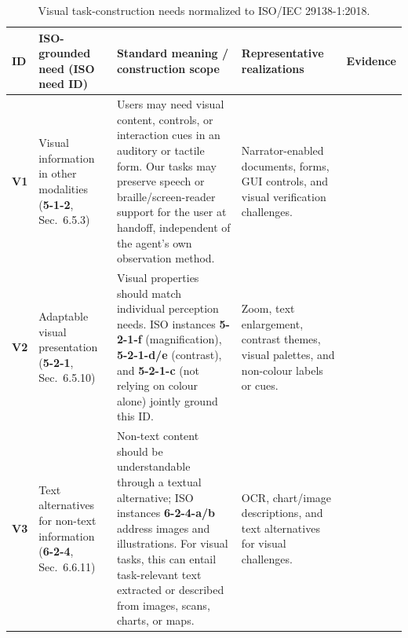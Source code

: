 \documentclass[11pt]{article}
\begin{document}
\begin{table}[t]
\centering
\scriptsize
\begin{tabularx}{\textwidth}{>{\bfseries}p{} p{} p{} X p{}}
\toprule
ID & ISO-grounded need (ISO need ID) & Standard meaning / construction scope & Representative realizations & Evidence \tabularnewline
\midrule
V1 & Visual information in other modalities (\textbf{5-1-2}, Sec.~6.5.3) & Users may need visual content, controls, or interaction cues in an auditory or tactile form. Our tasks may preserve speech or braille/screen-reader support for the user at handoff, independent of the agent's own observation method. & Narrator-enabled documents, forms, GUI controls, and visual verification challenges. & \citep{iso29138,webaimsr,w3cvisual,w3cstories} \tabularnewline
V2 & Adaptable visual presentation (\textbf{5-2-1}, Sec.~6.5.10) & Visual properties should match individual perception needs. ISO instances \textbf{5-2-1-f} (magnification), \textbf{5-2-1-d/e} (contrast), and \textbf{5-2-1-c} (not relying on colour alone) jointly ground this ID. & Zoom, text enlargement, contrast themes, visual palettes, and non-colour labels or cues. & \citep{iso29138,webaimlv,w3cresize,w3ccolor,mscolor} \tabularnewline
V3 & Text alternatives for non-text information (\textbf{6-2-4}, Sec.~6.6.11) & Non-text content should be understandable through a textual alternative; ISO instances \textbf{6-2-4-a/b} address images and illustrations. For visual tasks, this can entail task-relevant text extracted or described from images, scans, charts, or maps. & OCR, chart/image descriptions, and text alternatives for visual challenges. & \citep{iso29138,webaimsr,w3cnontext,w3cstories} \tabularnewline
\bottomrule
\end{tabularx}
\caption{Visual task-construction needs normalized to ISO/IEC 29138-1:2018. }
\label{tab:visual_needs}
\end{table}
\end{document}

